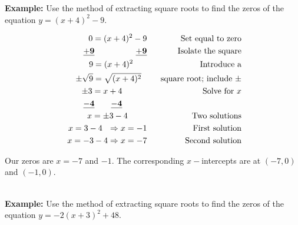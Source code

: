 \documentclass[12pt]{article}
\theoremstyle{definition}
\begin{document}
{\bf Example:} Use the method of extracting square roots to find the zeros of the equation $y = (x+4)^2-9$.
\begin{multicols}{2}
\begin{center}
\end{center}

\columnbreak

\begin{eqnarray*}
    \ 0 = (x+4)^2-9 &  &  \text{Set equal to zero}\\
    \ {\bf \underline{+9}~~~~~~~~~~~~~~~\underline{+9}}   & & \text{Isolate the square}\\
    \ 9=(x+4)^2~~~~~ & & \text{Introduce a}\\
		\pm\sqrt{9} = \sqrt{(x+4)^2}~~ & &  ~~\text{square root; include} \ \pm \\
		\ \pm3 = x + 4~~~~~~~~~  & &  \text{Solve for} \ x\\
		\ {\bf \underline{-4}~~~~~~\underline{-4}}~~~~~~~~~  & & \\
		\ x=\pm3 - 4~~~~~~~ & & \text{Two solutions} \\
		\ x=3 - 4~~ \Rightarrow x = -1   & & \text{First solution}\\
		\ x=-3 - 4 \Rightarrow x = -7  & & \text{Second solution}
\end{eqnarray*}
\end{multicols}
Our zeros are $x=-7$ and $-1$.  The corresponding $x-$intercepts are at $(-7,0)$ and $(-1,0)$.\\
\ \par
{\bf Example:} Use the method of extracting square roots to find the zeros of the equation $y = -2(x+3)^2+48$.\\
\end{document}
